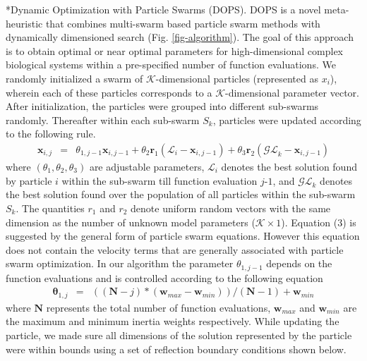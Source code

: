 \documentclass[12pt]{article}
\makeatletter
\renewcommand\subsection{\@startsection
	{subsection}{2}{0mm}
	{-0.05in}
	{-0.5\baselineskip}
	{\normalfont\normalsize\bfseries}}
\makeatother
\begin{document}
\subsection*{Dynamic Optimization with Particle Swarms (DOPS).}
DOPS is a novel meta-heuristic that combines multi-swarm based particle swarm methods with dynamically dimensioned search (Fig. \ref{fig-algorithm}).
The goal of this approach is to obtain optimal or near optimal parameters for high-dimensional complex biological systems within a pre-specified number of function evaluations. We randomly initialized a swarm of $\mathcal{K}$-dimensional particles (represented as ${x}_{i}$), wherein each of these particles corresponds to a $\mathcal{K}$-dimensional parameter vector. After initialization, the particles were grouped into different sub-swarms randomly. Thereafter within each sub-swarm ${S}_{k}$,  particles were updated according to the following rule.
\begin{eqnarray}
	\mathbf{x}_{i,j} &=&\theta_{1,j-1}\mathbf{x}_{i,j-1} + \theta_{2}\mathbf{r}_{1}\left(\mathcal{L}_{i} - \mathbf{x}_{i,j-1}\right) + \theta_{3}\mathbf{r}_{2}\left(\mathcal{GL}_{k} - \mathbf{x}_{i,j-1}\right)
\end{eqnarray}
where $\left(\theta_{1},\theta_{2},\theta_{3}\right)$ are adjustable parameters, $\mathcal{L}_{i}$ denotes the best solution found by particle $i$ within the sub-swarm till function evaluation $j$-$1$, and
$\mathcal{GL}_{k}$ denotes the best solution found over the population of all particles within the sub-swarm ${S}_{k}$. The quantities $r_{1}$ and $r_{2}$ denote uniform random vectors with the same dimension as the number of unknown model
parameters ($\mathcal{K}\times{1}$). Equation (3) is suggested by the general form of particle swarm equations. However this equation does not contain the velocity terms that are generally associated with particle swarm optimization. In our algorithm the parameter $\theta_{1,j-1}$ depends on the function evaluations and is controlled according to the following equation
\begin{eqnarray}
	\mathbf \theta_{1,j}&=&((\mathbf{N}-{j})*(\mathbf{w}_{max}-\mathbf{w}_{min}))/(\mathbf{N}-{1}) + \mathbf{w}_{min}
\end{eqnarray}
where $\mathbf{N}$ represents the total number of function evaluations, $\mathbf{w}_{max}$ and $\mathbf{w}_{min}$ are the maximum and minimum inertia weights respectively. While updating the particle, we made sure all dimensions of the solution represented by the particle were within bounds using a set of reflection boundary conditions shown below.
\end{document}
